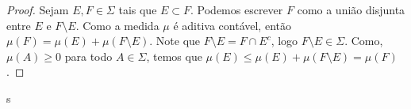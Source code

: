\begin{proof}
    Sejam $E,F\in\Sigma$ tais que $E\subset F$. Podemos escrever $F$ como a união disjunta entre $E$ e $F\setminus E$. Como a medida $\mu$ é aditiva contável, então $\mu(F)=\mu(E)+\mu(F\setminus E)$. Note que $F\setminus E=F\cap E^{c}$, logo $F\setminus E\in \Sigma$. Como, $\mu(A)\geq 0$ para todo $A\in \Sigma$, temos que $\mu(E)\leq \mu(E)+\mu(F\setminus E)=\mu(F)$.
\end{proof}s